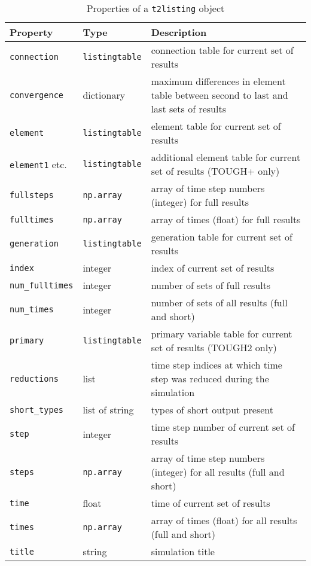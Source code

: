\begin{table}
  \begin{center}
    \begin{tabular}{|l|l|p{70mm}|}
      \hline
      \textbf{Property} & \textbf{Type} & \textbf{Description}\\
      \hline
      \texttt{connection} & \texttt{listingtable} & connection table for current set of results\\
      \texttt{convergence} & dictionary & maximum differences in element table between second to last and last sets of results\\
      \texttt{element} & \texttt{listingtable} & element table for current set of results\\
      \texttt{element1} etc. & \texttt{listingtable} & additional element table for current set of results (TOUGH+ only)\\
      \texttt{fullsteps} & \texttt{np.array} & array of time step numbers (integer) for full results\\
      \texttt{fulltimes} & \texttt{np.array} & array of times (float) for full results\\
      \texttt{generation} & \texttt{listingtable} & generation table for current set of results\\
      \texttt{index} & integer & index of current set of results\\
      \texttt{num\_fulltimes} & integer & number of sets of full results\\
      \texttt{num\_times} & integer & number of sets of all results (full and short)\\
      \texttt{primary} & \texttt{listingtable} & primary variable table for current set of results (TOUGH2 only)\\
      \texttt{reductions} & list & time step indices at which time step was reduced during the simulation\\
      \texttt{short\_types} & list of string & types of short output present\\
      \texttt{step} & integer & time step number of current set of results\\
      \texttt{steps} & \texttt{np.array} & array of time step numbers (integer) for all results (full and short)\\
      \texttt{time} & float & time of current set of results\\
      \texttt{times} & \texttt{np.array} & array of times (float) for all results (full and short)\\
      \texttt{title} & string & simulation title\\
      \hline
    \end{tabular}
    \caption{Properties of a \texttt{t2listing} object}
    \label{tb:t2listing_properties}
  \end{center}
\end{table}

